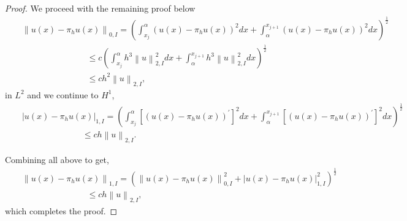 \documentclass[11pt]{article}
\numberwithin{equation}{section}
\begin{document}
\begin{proof}
We proceed with the remaining proof below
\begin{eqnarray*}
&&\left\|u\left(x\right)-\pi_{h} u\left(x\right)\right\|_{0, I}=\left(\int_{x_{j}}^{\alpha}\left(u\left(x\right)-\pi_{h} u\left(x\right)\right)^{2}dx+\int_{\alpha}^{x_{j+1}}\left(u\left(x\right)-\pi_{h} u\left(x\right)\right)^{2}dx\right)^{\frac{1}{2}}\\
&&~~\quad~~~\qquad\qquad\quad~~\leq c\left(\int_{x_{j}}^{\alpha}h^{3}\left\|u\right\|_{2,I}^{2}dx+\int_{\alpha}^{x_{j+1}}h^{3}\left\|u\right\|_{2,I}^{2}dx\right)^{\frac{1}{2}} \\
&&~~\quad~~~\qquad\qquad\quad~~\leq ch^{2}\left\|u\right\|_{2,I},
\end{eqnarray*}
in $L^2$ and we continue to $H^1$,
\begin{eqnarray*}
&&\left|u\left(x\right)-\pi_{h} u\left(x\right)\right|_{1, I}=\left(\int_{x_{j}}^{\alpha}\left[\left(u\left(x\right)-\pi_{h} u\left(x\right)\right)^{'}\right]^{2}dx+\int_{\alpha}^{x_{j+1}}\left[\left(u\left(x\right)-\pi_{h} u\left(x\right)\right)^{'}\right]^{2}dx\right)^{\frac{1}{2}}\\
&&~~~\qquad~~~~\qquad\quad~~\leq c h\left\|u\right\|_{2,I}.
\end{eqnarray*}

Combining all above to get,
\begin{eqnarray*}
&&\left\|u\left(x\right)-\pi_{h} u\left(x\right)\right\|_{1, I}=\left(\left\|u\left(x\right)-\pi_{h} u\left(x\right)\right\|_{0, I}^{2}+\left|u(x)-\pi_{h} u(x)\right|_{1, I}^{2}\right)^{\frac{1}{2}}\\
&&~~~\quad\qquad\qquad\quad~~~~\leq c h\left\|u\right\|_{2, I},
\end{eqnarray*}
which completes the proof.
\end{proof}
\end{document}
